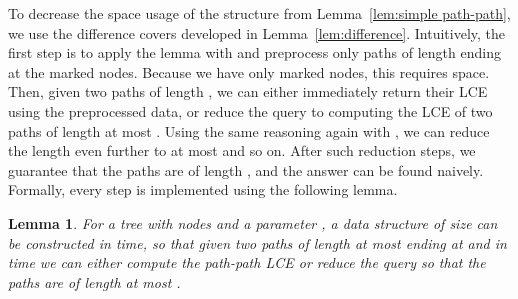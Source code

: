 \documentclass [10pt]{article}
\newtheorem{lemma}{Lemma}
\begin{document}
To decrease the space usage of the structure from Lemma~\ref{lem:simple path-path}, we use the difference covers developed in
Lemma~\ref{lem:difference}. Intuitively, the first step is to apply the lemma with  and preprocess only paths of length 
ending at the marked nodes. Because we have only  marked nodes, this requires  space. Then, given two paths of length
, we can either immediately return their LCE using the preprocessed data, or reduce the query to computing
the LCE of two paths of length at most . Using the same reasoning again with ,
we can reduce the length even further to at most  and so on. After  such reduction steps, we guarantee that the
paths are of length , and the answer can be found naively. Formally, every step is implemented using the following lemma.

\begin{lemma}
For a tree  with  nodes and a parameter , a data structure of size  can be constructed in  time, so that given two paths of
length at most  ending at  and  in  time we can either compute the path-path LCE or reduce the query so that
the paths are of length at most .
\label{lem:path-path reduction}
\end{lemma}
\end{document}

